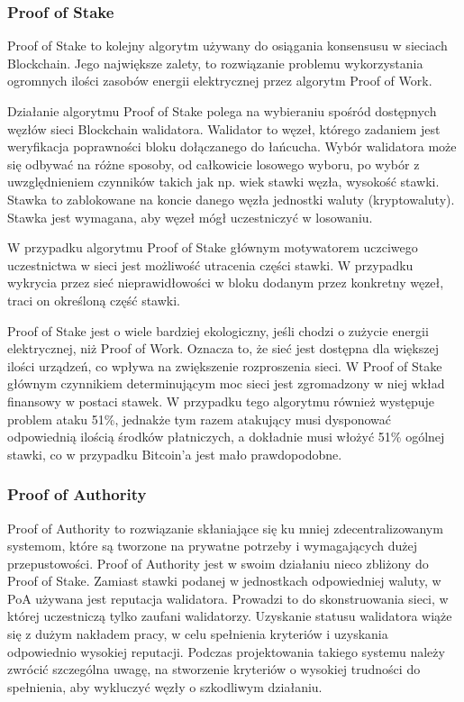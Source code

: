\documentclass[a4paper,12pt]{book}
\begin{document}
\subsubsection{Proof of Stake}

Proof of Stake to kolejny algorytm używany do osiągania konsensusu w sieciach Blockchain. Jego największe zalety, to rozwiązanie problemu wykorzystania ogromnych ilości zasobów energii elektrycznej przez algorytm Proof of Work.

Działanie algorytmu Proof of Stake polega na wybieraniu spośród dostępnych węzłów sieci Blockchain walidatora. Walidator to węzeł, którego zadaniem jest weryfikacja poprawności bloku dołączanego do łańcucha. Wybór walidatora może się odbywać na różne sposoby, od całkowicie losowego wyboru, po wybór z uwzględnieniem czynników takich jak np. wiek stawki węzła, wysokość stawki. Stawka to zablokowane na koncie danego węzła jednostki waluty (kryptowaluty). Stawka jest wymagana, aby węzeł mógł uczestniczyć w losowaniu.

W przypadku algorytmu Proof of Stake głównym motywatorem uczciwego uczestnictwa w sieci jest możliwość utracenia części stawki. W przypadku wykrycia przez sieć nieprawidłowości w bloku dodanym przez konkretny węzeł, traci on określoną część stawki.

Proof of Stake jest o wiele bardziej ekologiczny, jeśli chodzi o zużycie energii elektrycznej, niż Proof of Work. Oznacza to, że sieć jest dostępna dla większej ilości urządzeń, co wpływa na zwiększenie rozproszenia sieci. W Proof of Stake głównym czynnikiem determinującym moc sieci jest zgromadzony w niej wkład finansowy w postaci stawek. W przypadku tego algorytmu również występuje problem ataku 51\%, jednakże tym razem atakujący musi dysponować odpowiednią ilością środków płatniczych, a dokładnie musi włożyć 51\% ogólnej stawki, co w przypadku Bitcoin'a jest mało prawdopodobne.

\subsubsection{Proof of Authority}
Proof of Authority to rozwiązanie skłaniające się ku mniej zdecentralizowanym systemom, które są tworzone na prywatne potrzeby i wymagających dużej przepustowości. Proof of Authority jest w swoim działaniu nieco zbliżony do Proof of Stake. Zamiast stawki podanej w jednostkach odpowiedniej waluty, w PoA używana jest reputacja walidatora. Prowadzi to do skonstruowania sieci, w której uczestniczą tylko zaufani walidatorzy. Uzyskanie statusu walidatora wiąże się z dużym nakładem pracy, w celu spełnienia kryteriów i uzyskania odpowiednio wysokiej reputacji. Podczas projektowania takiego systemu należy zwrócić szczególna uwagę, na stworzenie kryteriów o wysokiej trudności do spełnienia, aby wykluczyć węzły o szkodliwym działaniu.
\end{document}
